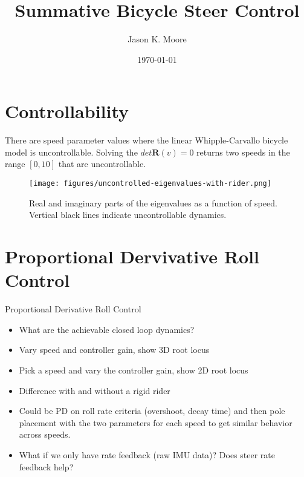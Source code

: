 \documentclass[12pt]{article}
\title{Summative Bicycle Steer Control}
\author{Jason K. Moore}
\date{\today}
\begin{document}
\maketitle

\section{Controllability}

There are speed parameter values where the linear Whipple-Carvallo bicycle
model is uncontrollable. Solving the \(det{\mathbf{R}(v)}=0\) returns two
speeds in the range \([0, 10]\) that are uncontrollable.

\begin{figure}
  \centering
  \texttt{[image: figures/uncontrolled-eigenvalues-with-rider.png]}
  \caption{Real and imaginary parts of the eigenvalues as a function of speed.
  Vertical black lines indicate uncontrollable dynamics.}
  \label{fig:uncontrolled-eigenvalues-with-rider}
\end{figure}

\section{Proportional Dervivative Roll Control}

Proportional Derivative Roll Control

\begin{itemize}
  \item What are the achievable closed loop dynamics?
  \item Vary speed and controller gain, show 3D root locus
  \item Pick a speed and vary the controller gain, show 2D root locus
  \item Difference with and without a rigid rider
  \item Could be PD on roll rate criteria (overshoot, decay time) and then pole
    placement with the two parameters for each speed to get similar behavior
    across speeds.
  \item What if we only have rate feedback (raw IMU data)? Does steer rate
    feedback help?
\end{itemize}
\end{document}
